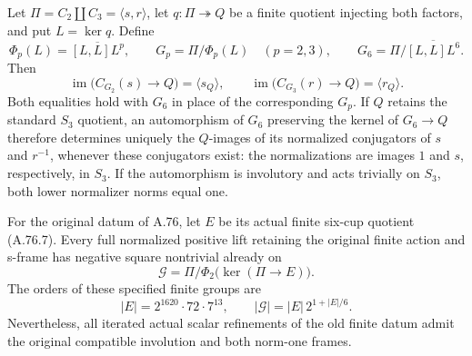 Let \(\Pi=C_2\amalg C_3=\langle s,r\rangle\), let
\(q:\Pi\twoheadrightarrow Q\) be a finite quotient injecting both
factors, and put \(L=\ker q\). Define
\[
 \Phi_p(L)=\overline{[L,L]L^p},\qquad
 G_p=\Pi/\Phi_p(L)\quad(p=2,3),\qquad
 G_6=\Pi/\overline{[L,L]L^6}.
 \tag{A.77.1}
\]
Then
\[
 \operatorname{im}\bigl(C_{G_2}(s)\longrightarrow Q\bigr)
       =\langle s_Q\rangle,
 \qquad
 \operatorname{im}\bigl(C_{G_3}(r)\longrightarrow Q\bigr)
       =\langle r_Q\rangle.
 \tag{A.77.2}
\]
Both equalities hold with \(G_6\) in place of the corresponding
\(G_p\). If \(Q\) retains the standard \(S_3\) quotient, an
automorphism of \(G_6\) preserving the kernel of
\(G_6\to Q\) therefore determines uniquely the
\(Q\)-images of its normalized conjugators of \(s\) and
\(r^{-1}\), whenever these conjugators exist: the normalizations
are images \(1\) and \(s\), respectively, in \(S_3\).
If the automorphism is involutory and acts trivially on \(S_3\),
both lower normalizer norms equal one.

For the original datum of A.76, let \(E\) be its actual finite
six-cup quotient (A.76.7). Every full normalized positive lift
retaining the original finite action and s-frame has negative
square nontrivial already on
\[
 \mathcal G=\Pi/\Phi_2\bigl(\ker(\Pi\to E)\bigr).
 \tag{A.77.3}
\]
The orders of these specified finite groups are
\[
 |E|=2^{1620}\cdot72\cdot7^{13},\qquad
 |\mathcal G|=|E|\,2^{1+|E|/6}.
 \tag{A.77.4}
\]
Nevertheless, all iterated actual scalar refinements of the old
finite datum admit the original compatible involution and both
norm-one frames.

